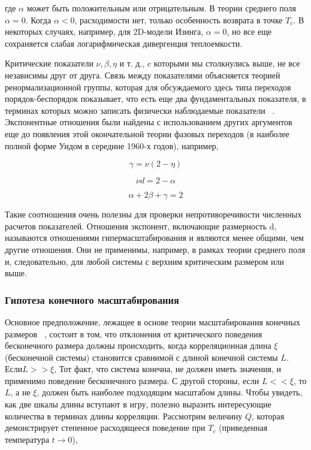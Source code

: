 \documentclass[11pt]{article}
\begin{document}
где $\alpha$ может быть положительным или отрицательным. В теории среднего поля $\alpha=0$. Когда $\alpha<0$, расходимости нет, только особенность возврата в точке $T_c$. В некоторых случаях, например, для 2D-модели Изинга, $\alpha=0$, но все еще сохраняется слабая логарифмическая дивергенция теплоемкости.

Критические показатели $\nu,\beta,\eta$ и т. д., c которыми мы столкнулись выше, не все независимы друг от друга. Связь между показателями объясняется теорией ренормализационной группы, которая для обсуждаемого здесь типа переходов порядок-беспорядок показывает, что есть еще два фундаментальных показателя, в терминах которых можно записать физически наблюдаемые показатели ~\cite{cardy}. Экспонентные отношения были найдены с использованием других аргументов еще до появления этой окончательной теории фазовых переходов (в наиболее полной форме Уидом в середине 1960-х годов), например,

\begin{equation*}
\gamma = \nu(2-\eta)
\end{equation*}

\begin{equation}
\nu d = 2 - \alpha
\label{eq_58}
\end{equation}

\begin{equation*}
\alpha + 2\beta + \gamma = 2
\end{equation*}

Такие соотношения очень полезны для проверки непротиворечивости численных расчетов показателей. Отношения экспонент, включающие размерность d, называются отношениями гипермасштабирования и являются менее общими, чем другие отношения. Они не применимы, например, в рамках теории среднего поля и, следовательно, для любой системы с верхним критическим размером или выше.

\subsubsection{Гипотеза конечного масштабирования}
Основное предположение, лежащее в основе теории масштабирования конечных размеров ~\cite{prl_28_1516}, состоит в том, что отклонения от критического поведения бесконечного размера должны происходить, когда корреляционная длина $\xi$ (бесконечной системы) становится сравнимой с длиной конечной системы $L$. Если$ L >>\xi$, Тот факт, что система конечна, не должен иметь значения, и применимо поведение бесконечного размера.
С другой стороны, если $L<<\xi$, то $L$, а не $\xi$, должен быть наиболее подходящим масштабом длины. Чтобы увидеть, как две шкалы длины вступают в игру, полезно выразить интересующие количества в терминах длины корреляции. Рассмотрим величину $Q$, которая демонстрирует степенное расходящееся поведение при $T_c$ (приведенная температура $t → 0$),
\end{document}
